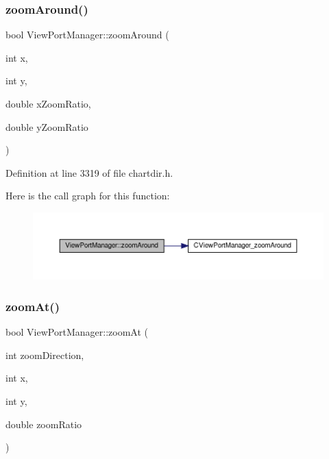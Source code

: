 \subsubsection{\texorpdfstring{zoom\+Around()}{zoomAround()}}
{\footnotesize\ttfamily bool View\+Port\+Manager\+::zoom\+Around (\begin{DoxyParamCaption}\item[{int}]{x,  }\item[{int}]{y,  }\item[{double}]{x\+Zoom\+Ratio,  }\item[{double}]{y\+Zoom\+Ratio }\end{DoxyParamCaption})\hspace{0.3cm}{\ttfamily [inline]}}



Definition at line 3319 of file chartdir.\+h.

Here is the call graph for this function\+:
\nopagebreak
\begin{figure}[H]
\begin{center}
\leavevmode
\includegraphics[width=350pt]{class_view_port_manager_ae1be85f3a163f841202bdc260d04f8f3_cgraph}
\end{center}
\end{figure}
\mbox{\label{class_view_port_manager_a91160303aebb6d58369175131022b3e6}} 
\subsubsection{\texorpdfstring{zoom\+At()}{zoomAt()}}
{\footnotesize\ttfamily bool View\+Port\+Manager\+::zoom\+At (\begin{DoxyParamCaption}\item[{int}]{zoom\+Direction,  }\item[{int}]{x,  }\item[{int}]{y,  }\item[{double}]{zoom\+Ratio }\end{DoxyParamCaption})\hspace{0.3cm}{\ttfamily [inline]}}



